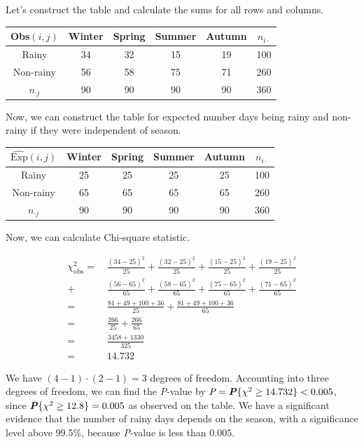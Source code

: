 \documentclass[12pt]{article}
\begin{document}
Let's construct the table and calculate the sums for all rows and columns.

\begin{center}
\begin{tabular}{c|c c c c|c}
Obs$(i,j)$    & Winter & Spring & Summer & Autumn & $n_{i \cdot}$ \\
\hline
Rainy         & 34 & 32 & 15 & 19 & 100 \\
Non-rainy     & 56 & 58 & 75 & 71 & 260 \\
\hline
$n_{\cdot j}$ & 90 & 90 & 90 & 90 & 360 \\
\end{tabular}
\end{center}

Now, we can construct the table for expected number days being rainy and
non-rainy if they were independent of season.

\begin{center}
\begin{tabular}{c|c c c c|c}
$\widehat{\text{Exp}}(i,j)$
              & Winter & Spring & Summer & Autumn & $n_{i \cdot}$ \\
\hline
Rainy         & 25 & 25 & 25 & 25 & 100 \\
Non-rainy     & 65 & 65 & 65 & 65 & 260 \\
\hline
$n_{\cdot j}$ & 90 & 90 & 90 & 90 & 360 \\
\end{tabular}
\end{center}

Now, we can calculate Chi-square statistic.

\begin{align*}
    \chi^2_\text{obs} =\ &\frac{(34-25)^2}{25} + \frac{(32-25)^2}{25}
                      +   \frac{(15-25)^2}{25} + \frac{(19-25)^2}{25} \\[0.75ex]
                      +\ &\frac{(56-65)^2}{65} + \frac{(58-65)^2}{65}
                      +   \frac{(75-65)^2}{65} + \frac{(71-65)^2}{65} \\[0.75ex]
    =\ &\frac{81+49+100+36}{25} + \frac{81+49+100+36}{65} \\[0.75ex]
    =\ &\frac{266}{25} + \frac{266}{65} \\[0.75ex]
    =\ &\frac{3458+1330}{325} \\[0.75ex]
    =\ &14.732
\end{align*}

We have $(4-1)\cdot(2-1) = 3$ degrees of freedom. Accounting into three degrees
of freedom, we can find the \textit{P}-value by $\textit{P} =
\textbf{\textit{P}}\{\chi^2 \geq 14.732\} < 0.005$, since
$\textbf{\textit{P}}\{\chi^2 \geq 12.8\} = 0.005$ as observed on the table. We
have a significant evidence that the number of rainy days depends on the season,
with a significance level above 99.5\%, because \textit{P}-value is less than
$0.005$.
\end{document}
